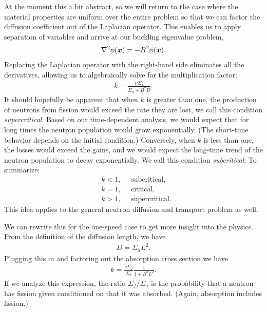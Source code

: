 At the moment this a bit abstract, so we will return to the case where the material properties are uniform over the entire problem so that we can factor the diffusion coefficient out of the Laplacian operator. This enables us to apply separation of variables and arrive at our buckling eigenvalue problem,
\begin{align}
  \nabla^2 \phi(\bm{x}) = -B^2 \phi(\bm{x}) .
\end{align}
Replacing the Laplacian operator with the right-hand side eliminates all the derivatives, allowing us to algebraically solve for the multiplication factor:
\begin{align}
  k = \frac{ \nu \Sigma_f }{ \Sigma_a + B^2 D } .
\end{align}
It should hopefully be apparent that when $k$ is greater than one, the production of neutrons from fission would exceed the rate they are lost, we call this condition \emph{supercritical}. Based on our time-dependent analysis, we would expect that for long times the neutron population would grow exponentially. (The short-time behavior depends on the initial condition.) Conversely, when $k$ is less than one, the losses would exceed the gains, and we would expect the long-time trend of the neutron population to decay exponentially. We call this condition \emph{subcritical}. To summarize:
\begin{align}
  &k < 1, \quad \text{ subcritical}, \nonumber \\
  &k = 1, \quad \text{ critical}, \nonumber \\
  &k > 1, \quad \text{ supercritical}. \nonumber
\end{align}
This idea applies to the general neutron diffusion and transport problem as well.

We can rewrite this for the one-speed case to get more insight into the physics. From the definition of the diffusion length, we have
\begin{align}
  D = \Sigma_a L^2 . \nonumber
\end{align}
Plugging this in and factoring out the absorption cross section we have
\begin{align}
  k = \frac{ \nu \Sigma_f }{ \Sigma_a } \frac{1}{ 1 + B^2 L^2 } .
\end{align}
If we analyze this expression, the ratio $\Sigma_f / \Sigma_a$ is the probability that a neutron has fission given conditioned on that it was absorbed. (Again, absorption includes fission.) 

